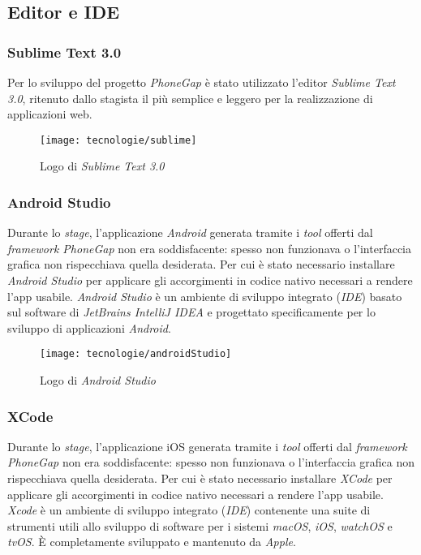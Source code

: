 \subsection{Editor e IDE}

\subsubsection{Sublime Text 3.0}

Per lo sviluppo del progetto \textit{PhoneGap} è stato utilizzato l'editor \textit{Sublime Text 3.0}, ritenuto dallo stagista il più semplice e leggero per la realizzazione di applicazioni web. 

\begin{figure}[!h] 
    \centering 
    \texttt{[image: tecnologie/sublime]} 
    \caption{Logo di \textit{Sublime Text 3.0}}
\end{figure}

\subsubsection{Android Studio}

Durante lo \textit{stage}, l'applicazione \textit{Android} generata tramite i \textit{tool} offerti dal \textit{framework PhoneGap} non era soddisfacente: spesso non funzionava o l'interfaccia grafica non rispecchiava quella desiderata. Per cui è stato necessario installare \textit{Android Studio} per applicare gli accorgimenti in codice nativo necessari a rendere l'app usabile. \textit{Android Studio} è un ambiente di sviluppo integrato (\textit{IDE}) basato sul software di \textit{JetBrains IntelliJ IDEA} e progettato specificamente per lo sviluppo di applicazioni \textit{Android}.

\begin{figure}[!h] 
    \centering 
    \texttt{[image: tecnologie/androidStudio]} 
    \caption{Logo di \textit{Android Studio}}
\end{figure}

\subsubsection{XCode}

Durante lo \textit{stage}, l'applicazione iOS generata tramite i \textit{tool} offerti dal \textit{framework PhoneGap} non era soddisfacente: spesso non funzionava o l'interfaccia grafica non rispecchiava quella desiderata. Per cui è stato necessario installare \textit{XCode} per applicare gli accorgimenti in codice nativo necessari a rendere l'app usabile. \textit{Xcode} è un ambiente di sviluppo integrato (\textit{IDE}) contenente una suite di strumenti utili allo sviluppo di software per i sistemi \textit{macOS}, \textit{iOS}, \textit{watchOS} e \textit{tvOS}. È completamente sviluppato e mantenuto da \textit{Apple}.

